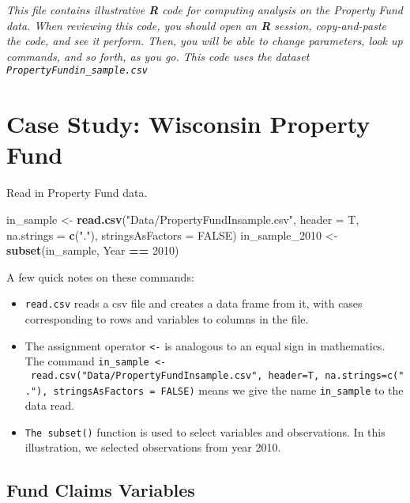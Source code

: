 \documentclass[]{book}
\newenvironment{Shaded}{\begin{snugshade}}{\end{snugshade}}
\newcommand{\KeywordTok}[1]{\textcolor[rgb]{0.13,0.29,0.53}{\textbf{#1}}}
\newcommand{\DataTypeTok}[1]{\textcolor[rgb]{0.13,0.29,0.53}{#1}}
\newcommand{\DecValTok}[1]{\textcolor[rgb]{0.00,0.00,0.81}{#1}}
\newcommand{\StringTok}[1]{\textcolor[rgb]{0.31,0.60,0.02}{#1}}
\newcommand{\OtherTok}[1]{\textcolor[rgb]{0.56,0.35,0.01}{#1}}
\newcommand{\OperatorTok}[1]{\textcolor[rgb]{0.81,0.36,0.00}{\textbf{#1}}}
\newcommand{\NormalTok}[1]{#1}
\theoremstyle{definition}
\theoremstyle{definition}
\theoremstyle{definition}
\theoremstyle{remark}
\begin{document}
\emph{This file contains illustrative \textbf{R} code for computing
analysis on the Property Fund data. When reviewing this code, you should
open an \textbf{R} session, copy-and-paste the code, and see it perform.
Then, you will be able to change parameters, look up commands, and so
forth, as you go. This code uses the dataset
\texttt{PropertyFundin\_sample.csv}}

\section{Case Study: Wisconsin Property
Fund}\label{case-study-wisconsin-property-fund}

Read in Property Fund data.

\begin{Shaded}
\begin{Highlighting}[]
\NormalTok{in_sample <-}\StringTok{ }\KeywordTok{read.csv}\NormalTok{(}\StringTok{"Data/PropertyFundInsample.csv"}\NormalTok{, }\DataTypeTok{header =}\NormalTok{ T, }
                      \DataTypeTok{na.strings =} \KeywordTok{c}\NormalTok{(}\StringTok{"."}\NormalTok{), }\DataTypeTok{stringsAsFactors =} \OtherTok{FALSE}\NormalTok{)}
\NormalTok{in_sample_}\DecValTok{2010}\NormalTok{ <-}\StringTok{ }\KeywordTok{subset}\NormalTok{(in_sample, Year }\OperatorTok{==}\StringTok{ }\DecValTok{2010}\NormalTok{)}
\end{Highlighting}
\end{Shaded}

A few quick notes on these commands:

\begin{itemize}
\item
  \texttt{read.csv} reads a csv file and creates a data frame from it,
  with cases corresponding to rows and variables to columns in the file.
\item
  The assignment operator \texttt{\textless{}-} is analogous to an equal
  sign in mathematics. The command
  \texttt{in\_sample\ \textless{}-\ read.csv("Data/PropertyFundInsample.csv",\ header=T,\ na.strings=c("."),\ stringsAsFactors\ =\ FALSE)}
  means we give the name \texttt{in\_sample} to the data read.
\item
  \texttt{The\ subset()} function is used to select variables and
  observations. In this illustration, we selected observations from year
  2010.
\end{itemize}

\subsection{Fund Claims Variables}\label{fund-claims-variables}
\end{document}
